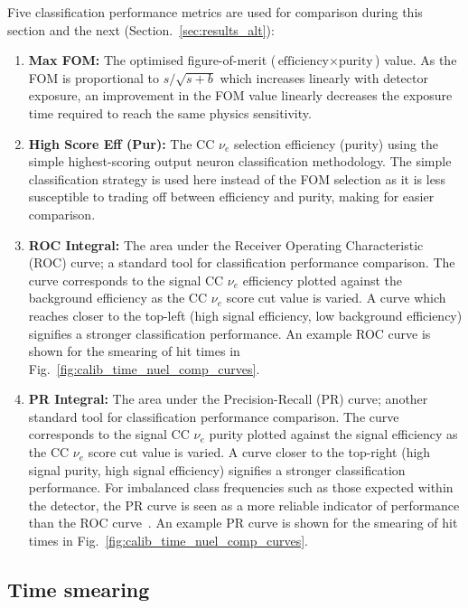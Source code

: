Five classification performance metrics are used for comparison during this section and the next
(Section.~\ref{sec:results_alt}):
\begin{enumerate}
    \item \textbf{Max FOM:} The optimised figure-of-merit ($\text{efficiency}\times\text{purity}$)
          value. As the FOM is proportional to $s/\sqrt{s+b}$ which increases linearly with
          detector exposure, an improvement in the FOM value linearly decreases the exposure time
          required to reach the same physics sensitivity.
    \item \textbf{High Score Eff (Pur):} The CC $\nu_{e}$ selection efficiency (purity) using the
          simple highest-scoring output neuron classification methodology. The simple
          classification strategy is used here instead of the FOM selection as it is less
          susceptible to trading off between efficiency and purity, making for easier comparison.
    \item \textbf{ROC Integral:} The area under the Receiver Operating Characteristic (ROC) curve;
          a standard tool for classification performance comparison. The curve corresponds to the
          signal CC $\nu_{e}$ efficiency plotted against the background efficiency as the CC
          $\nu_{e}$ score cut value is varied. A curve which reaches closer to the top-left (high
          signal efficiency, low background efficiency) signifies a stronger classification
          performance. An example ROC curve is shown for the smearing of hit times in
          Fig.~\ref{fig:calib_time_nuel_comp_curves}.
    \item \textbf{PR Integral:} The area under the Precision-Recall (PR) curve; another standard
          tool for classification performance comparison. The curve corresponds to the signal CC
          $\nu_{e}$ purity plotted against the signal efficiency as the CC $\nu_{e}$ score cut
          value is varied. A curve closer to the top-right (high signal purity, high signal
          efficiency) signifies a stronger classification performance. For imbalanced class
          frequencies such as those expected within the \chipsfive detector, the PR curve is seen
          as a more reliable indicator of performance than the ROC curve~\cite{saito2015}. An
          example PR curve is shown for the smearing of hit times in
          Fig.~\ref{fig:calib_time_nuel_comp_curves}.
\end{enumerate}

\subsection{Time smearing} %
\label{sec:results_robust_time} %


